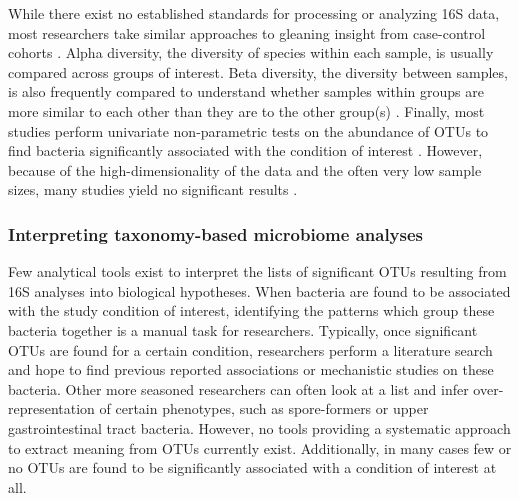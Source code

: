 \documentclass[12pt]{article}
\begin{document}
While there exist no established standards for processing or analyzing 
16S data, most researchers take similar approaches to gleaning insight 
from case-control cohorts \cite{knights-supervised-2010}. 
 Alpha diversity, the diversity of species within each sample, is usually compared across groups of interest. 
Beta diversity, the diversity between samples, is also frequently compared to understand whether 
samples within groups are more similar to each 
other than they are to the other group(s) \cite{knights-supervised-2010}. Finally, most studies perform 
univariate non-parametric tests on the abundance of OTUs to find 
bacteria significantly associated with the condition of interest \cite{wang-pval_method-2016}. 
However, because of the high-dimensionality of the data and the 
often very low sample sizes, many studies yield no significant
results \cite{wang-pval_method-2016}.

\subsubsection{Interpreting taxonomy-based microbiome analyses}\label{sec:gsea}
Few analytical tools exist to interpret the lists of
significant OTUs resulting from 16S analyses into biological hypotheses. 
When bacteria are found to be associated with the study condition of interest, 
identifying the patterns which group these bacteria 
together is a manual task for researchers. 
Typically, once significant OTUs are found for a certain condition,
researchers perform a literature search and hope to find 
previous reported associations or mechanistic studies on these bacteria.
Other more seasoned researchers can often look at a list and infer
over-representation of certain phenotypes, such as spore-formers
or upper gastrointestinal tract bacteria. However,
no tools providing a systematic approach to extract meaning from 
OTUs currently exist. Additionally, in many cases few or no OTUs are
found to be significantly associated with a condition of interest at all.
\end{document}
